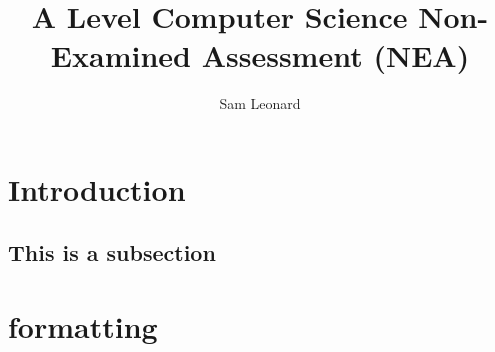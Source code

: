 \documentclass[titlepage]{article}
\author{Sam Leonard}
\title{A Level Computer Science Non-Examined Assessment (NEA)}
\begin{document}
\maketitle

\section{Introduction}
\subsection{This is a subsection}

\section{formatting}
\end{document}
